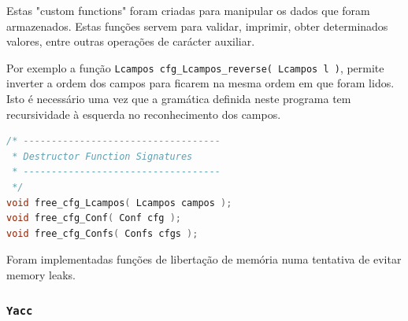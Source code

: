 \documentclass[11pt, a4paper, oneside]{article}
\begin{document}
Estas "custom functions" foram criadas para manipular os dados que foram armazenados. Estas funções servem para validar, imprimir, obter determinados valores, entre outras operações de carácter auxiliar.

Por exemplo a função \texttt{Lcampos cfg\_Lcampos\_reverse( Lcampos l )}, permite inverter a ordem dos campos para ficarem na mesma ordem em que foram lidos. Isto é necessário uma vez que a gramática definida neste programa tem recursividade à esquerda no reconhecimento dos campos.

\newpage
\begin{lstlisting}[language=C, caption={Funções de libertação de memória do módulo de configuração.}]
/* -----------------------------------
 * Destructor Function Signatures
 * -----------------------------------
 */
void free_cfg_Lcampos( Lcampos campos );
void free_cfg_Conf( Conf cfg );
void free_cfg_Confs( Confs cfgs );
\end{lstlisting} 

Foram implementadas funções de libertação de memória numa tentativa de evitar memory leaks.

\newpage
\subsubsection[Yacc]{\texttt{Yacc}}
\end{document}
